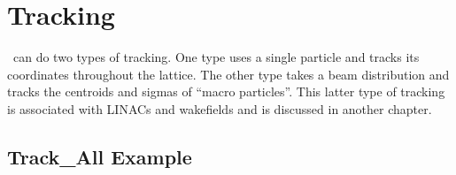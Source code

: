 \chapter{Tracking}
\label{s:tm}

\bmad\ can do two types of tracking. One type uses a single particle 
and tracks its coordinates throughout the lattice. The other type
takes a beam distribution and tracks the centroids and sigmas of
``macro particles''.  This latter type of tracking is associated with
LINACs and wakefields and is discussed in another chapter.


\section{Track\_All Example}

